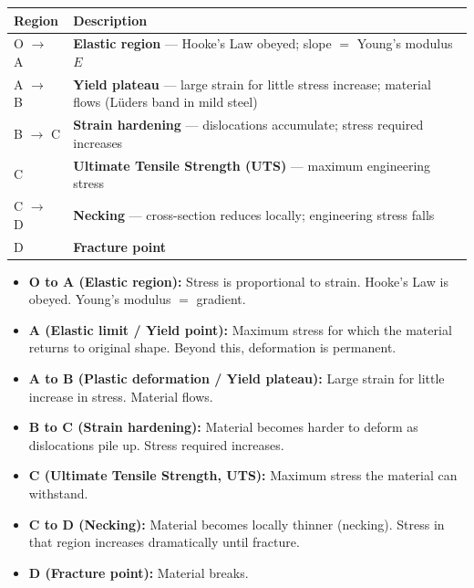 \begin{diagbox}
\vspace{0.4cm}
{\small
\renewcommand{\arraystretch}{1.5}
\begin{center}
\begin{tabular}{p{1.6cm} | p{10.5cm}}
\hline
\textbf{Region} & \textbf{Description} \\
\hline
O $\to$ A & \textbf{Elastic region} --- Hooke's Law obeyed; slope $=$ Young's modulus $E$ \\
A $\to$ B & \textbf{Yield plateau} --- large strain for little stress increase; material flows (L\"{u}ders band in mild steel) \\
B $\to$ C & \textbf{Strain hardening} --- dislocations accumulate; stress required increases \\
C & \textbf{Ultimate Tensile Strength (UTS)} --- maximum engineering stress \\
C $\to$ D & \textbf{Necking} --- cross-section reduces locally; engineering stress falls \\
D & \textbf{Fracture point} \\
\hline
\end{tabular}
\end{center}
}
\end{diagbox}

\begin{defbox}
\begin{itemize}[noitemsep]
  \item \textbf{O to A (Elastic region):} Stress is
  proportional to strain. Hooke's Law is obeyed.
  Young's modulus $= $ gradient.
  \item \textbf{A (Elastic limit / Yield point):}
  Maximum stress for which the material returns to
  original shape. Beyond this, deformation is permanent.
  \item \textbf{A to B (Plastic deformation / Yield
  plateau):} Large strain for little increase in stress.
  Material flows.
  \item \textbf{B to C (Strain hardening):} Material
  becomes harder to deform as dislocations pile up.
  Stress required increases.
  \item \textbf{C (Ultimate Tensile Strength, UTS):}
  Maximum stress the material can withstand.
  \item \textbf{C to D (Necking):} Material becomes
  locally thinner (necking). Stress in that region
  increases dramatically until fracture.
  \item \textbf{D (Fracture point):} Material breaks.
\end{itemize}
\end{defbox}

